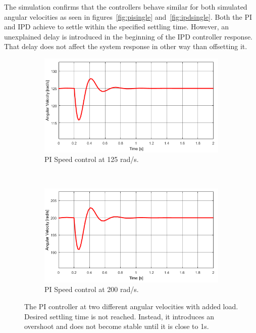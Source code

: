 The simulation confirms that the controllers behave similar for both simulated angular velocities as seen in figures~\ref{fig:pisingle} and~\ref{fig:ipdsingle}. Both the PI and IPD achieve to settle within the specified settling time. However, an unexplained delay is introduced in the beginning of the IPD controller response. That delay does not affect the system response in other way than offsetting it.

\begin{figure}[h!]
	\centering
	\begin{subfigure}[b]{0.45\textwidth}
		\includegraphics[width=\textwidth]{graphics/PI_load125}
		\caption{PI Speed control at 125 rad/s.}
		\label{fig:piload125}
	\end{subfigure}
	~ %
	\begin{subfigure}[b]{0.45\textwidth}
		\includegraphics[width=\textwidth]{graphics/PI_load200}
		\caption{PI Speed control at 200 rad/s.}
		\label{fig:piload200}
	\end{subfigure}
	\caption{The PI controller at two different angular velocities with added load. Desired settling time is not reached. Instead, it introduces an overshoot and does not become stable until it is close to 1s.}
	\label{fig:piload}
\end{figure}

